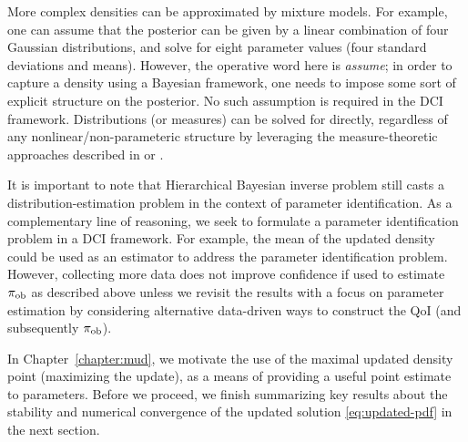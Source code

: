 More complex densities can be approximated by mixture models.
For example, one can assume that the posterior can be given by a linear combination of four Gaussian distributions, and solve for eight parameter values (four standard deviations and means).
However, the operative word here is \emph{assume}; in order to capture a density using a Bayesian framework, one needs to impose some sort of explicit structure on the posterior.
No such assumption is required in the DCI framework.
Distributions (or measures) can be solved for directly, regardless of any nonlinear/non-parameteric structure by leveraging the measure-theoretic approaches described in \cite{BE13} or \cite{BJW18a}.

It is important to note that Hierarchical Bayesian inverse problem still casts a distribution-estimation problem in the context of parameter identification.
As a complementary line of reasoning, we seek to formulate a parameter identification problem in a DCI framework.
For example, the mean of the updated density could be used as an estimator to address the parameter identification problem.
However, collecting more data does not improve confidence if used to estimate $\operatorname*{\pi_{ob}}$ as described above unless we revisit the results with a focus on parameter estimation by considering alternative data-driven ways to construct the QoI (and subsequently $\operatorname*{\pi_{ob}}$).

In Chapter~\ref{chapter:mud}, we motivate the use of the maximal updated density point (maximizing the update), as a means of providing a useful point estimate to parameters.
Before we proceed, we finish summarizing key results about the stability and numerical convergence of the updated solution \eqref{eq:updated-pdf} in the next section.

\FloatBarrier
